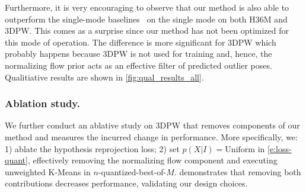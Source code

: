 Furthermore, it is very encouraging to observe that our method is also able to outperform the single-mode baselines~\cite{kanazawa18end-to-end,kolotouros19convolutional,kolotouros19learning} on the single mode \MPJPE on both H36M and 3DPW. 
This comes as a surprise since our method has not been optimized for this mode of operation.
The difference is more significant for 3DPW which probably happens because 3DPW is not used for training and, hence, the normalizing flow prior acts as an effective filter of predicted outlier poses. Qualitiative results are shown in \cref{fig:qual_results_all}.

\subsubsection{Ablation study.}
We further conduct an ablative study on 3DPW that removes components of our method and measures the incurred change in performance. More specifically, we: 1) ablate the hypothesis reprojection loss; 2) set $p(X|I)=\text{Uniform}$ in \cref{e:loss-quant}, effectively removing the normalizing flow component and executing unweighted K-Means in $n$-quantized-best-of-$M$.  demonstrates that removing both contributions decreases performance, validating our design choices.

% 

% 

% 






